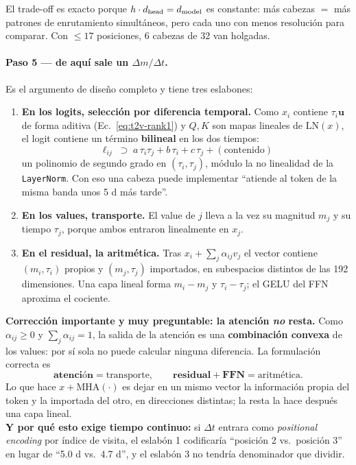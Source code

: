 \documentclass[11pt,a4paper]{article}
\newcommand{\code}[1]{\texttt{\small #1}}
\newlength{\examenpad}
\newenvironment{examen}
  {\par\medskip\noindent
   \begin{lrbox}{\examenbox}%
   \begin{minipage}{\dimexpr\linewidth-2\examenpad}\small}
  {\end{minipage}%
   \end{lrbox}%
   {\setlength{\fboxsep}{\examenpad}\colorbox{boxgray}{\usebox{\examenbox}}}%
   \par\medskip}
\begin{document}
El trade-off es exacto porque $h\cdot d_{\rm head} = d_{\rm model}$ es constante: más cabezas $=$ más
patrones de enrutamiento simultáneos, pero cada uno con menos resolución para comparar. Con $\le17$
posiciones, 6 cabezas de 32 van holgadas.

\paragraph{Paso 5 --- de aquí sale un $\Delta m/\Delta t$.} Es el argumento de diseño completo y tiene
tres eslabones:
\begin{enumerate}[nosep]
  \item \textbf{En los logits, selección por diferencia temporal.} Como $x_i$ contiene
        $\tau_i\mathbf{u}$ de forma aditiva (Ec.\ \eqref{eq:t2v-rank1}) y $Q,K$ son mapas lineales de
        $\mathrm{LN}(x)$, el logit contiene un término \textbf{bilineal} en los dos tiempos:
        \begin{equation}
        \ell_{ij} \;\supset\; a\,\tau_i\tau_j + b\,\tau_i + c\,\tau_j + (\text{contenido})
        \label{eq:logit-bilineal}
        \end{equation}
        un polinomio de segundo grado en $(\tau_i,\tau_j)$, módulo la no linealidad de la
        \code{LayerNorm}. Con eso una cabeza puede implementar ``atiende al token de la misma banda
        unos 5 d más tarde''.
  \item \textbf{En los values, transporte.} El value de $j$ lleva a la vez su magnitud $m_j$ y su
        tiempo $\tau_j$, porque ambos entraron linealmente en $x_j$.
  \item \textbf{En el residual, la aritmética.} Tras $x_i + \sum_j \alpha_{ij}v_j$ el vector contiene
        $(m_i,\tau_i)$ propios y $(m_j,\tau_j)$ importados, en subespacios distintos de las 192
        dimensiones. Una capa lineal forma $m_i - m_j$ y $\tau_i - \tau_j$; el GELU del FFN aproxima
        el cociente.
\end{enumerate}

\begin{examen}
\textbf{Corrección importante y muy preguntable: la atención \emph{no} resta.} Como
$\alpha_{ij}\ge0$ y $\sum_j\alpha_{ij}=1$, la salida de la atención es una \textbf{combinación
convexa} de los values: por sí sola no puede calcular ninguna diferencia. La formulación correcta es
\[
\textbf{atención} = \text{transporte}, \qquad \textbf{residual} + \textbf{FFN} = \text{aritmética}.
\]
Lo que hace $x + \mathrm{MHA}(\cdot)$ es dejar en un mismo vector la información propia del token y
la importada del otro, en direcciones distintas; la resta la hace después una capa lineal.\\[2pt]
\textbf{Y por qué esto exige tiempo continuo:} si $\Delta t$ entrara como \emph{positional encoding}
por índice de visita, el eslabón 1 codificaría ``posición 2 vs.\ posición 3'' en lugar de ``5.0 d
vs.\ 4.7 d'', y el eslabón 3 no tendría denominador que dividir.
\end{examen}
\end{document}
